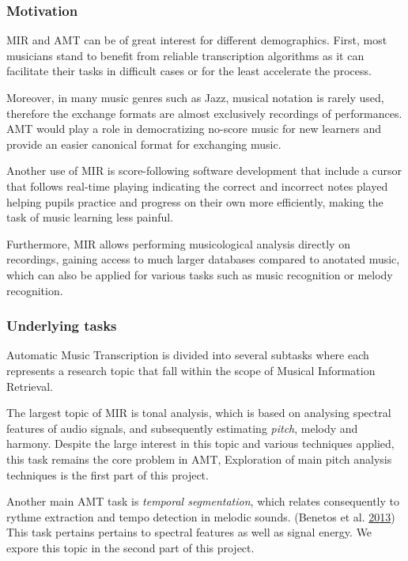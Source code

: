 \documentclass[american,]{article}
\begin{document}
\hypertarget{motivation}{%
\subsubsection{Motivation}\label{motivation}}

MIR and AMT can be of great interest for different demographics.
First, most musicians stand to benefit from reliable
transcription algorithms as it can facilitate their tasks in
difficult cases or for the least accelerate the process.

Moreover, in many music genres such as Jazz, musical
notation is rarely used, therefore the exchange formats
are almost exclusively recordings of performances.
AMT would play a role in democratizing no-score music
for new learners and provide an easier canonical
format for exchanging music.

Another use of MIR is score-following software development
that include a cursor that follows real-time playing
indicating the correct and incorrect notes played
helping pupils practice and progress on their
own more efficiently, making the task of music learning
less painful.

Furthermore, MIR allows performing musicological analysis
directly on recordings, gaining access to much larger
databases compared to anotated music, which can also
be applied for various tasks such as music recognition
or melody recognition.

\hypertarget{underlying-tasks}{%
\subsubsection{Underlying tasks}\label{underlying-tasks}}

Automatic Music Transcription is divided into several subtasks
where each represents a research topic that fall
within the scope of Musical Information Retrieval.

The largest topic of MIR is tonal analysis, which
is based on analysing spectral features of audio signals,
and subsequently estimating \emph{pitch}, melody and harmony.
Despite the large interest in this topic and various
techniques applied, this task remains the core problem in AMT,
Exploration of main pitch analysis techniques is the
first part of this project.

Another main AMT task is \emph{temporal segmentation},
which relates consequently to rythme extraction and tempo
detection in melodic sounds. (Benetos et al. \protect\hyperlink{ref-benetos_2013}{2013})
This task pertains pertains to spectral features
as well as signal energy.
We expore this topic in the second part of this project.
\end{document}
